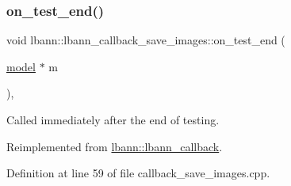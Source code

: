 \subsubsection{\texorpdfstring{on\+\_\+test\+\_\+end()}{on\_test\_end()}}
{\footnotesize\ttfamily void lbann\+::lbann\+\_\+callback\+\_\+save\+\_\+images\+::on\+\_\+test\+\_\+end (\begin{DoxyParamCaption}\item[{\hyperlink{classlbann_1_1model}{model} $\ast$}]{m }\end{DoxyParamCaption})\hspace{0.3cm}{\ttfamily [override]}, {\ttfamily [virtual]}}

Called immediately after the end of testing. 

Reimplemented from \hyperlink{classlbann_1_1lbann__callback_accbad4dd004c1ced33642db6398b2efe}{lbann\+::lbann\+\_\+callback}.



Definition at line 59 of file callback\+\_\+save\+\_\+images.\+cpp.


